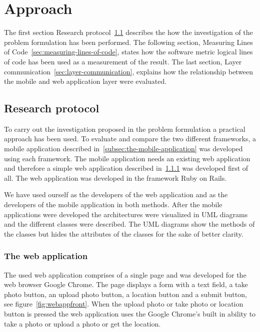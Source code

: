 \chapter{Approach} \label{ch:approach}
The first section Research protocol~\ref{sec:research-protocol} describes the how the investigation of the problem formulation has been performed. The following section, Measuring Lines of Code~\ref{sec:measuring-lines-of-code}, states how the software metric logical lines of code has been used as a measurement of the result. The last section, Layer communication~\ref{sec:layer-communication}, explains how the relationship between the mobile and web application layer were evaluated. 


\section{Research protocol} \label{sec:research-protocol}
To carry out the investigation proposed in the problem formulation a practical approach has been used. To evaluate and compare the two different frameworks, a mobile application described in~\ref{subsec:the-mobile-application} was developed using each framework. The mobile application needs an existing web application and therefore a simple web application described in~\ref{subsec:the-web-application} was developed first of all. The web application was developed in the framework Ruby on Rails.

We have used ourself as the developers of the web application and as the developers of the mobile application in both methods. After the mobile applications were developed the architectures were visualized in UML diagrams and the different classes were described. The UML diagrams show the methods of the classes but hides the attributes of the classes for the sake of better clarity. 

\subsection{The web application} \label{subsec:the-web-application}
The used web application comprises of a single page and was developed for the web browser Google Chrome. The page displays a form with a text field, a take photo button, an upload photo button, a location button and a submit button, see figure~\ref{fig:webappfront}. When the upload photo or take photo or location button is pressed the web application uses the Google Chrome’s built in ability to take a photo or upload a photo or get the location.

